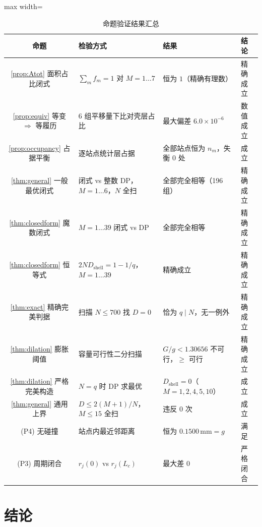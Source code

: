 \documentclass[12pt, a4paper]{ctexart}
\newcommand{\Umm}{\ensuremath{\,\mathrm{mm}}}
\begin{document}
\begin{table}[htbp]
\centering
\caption{命题验证结果汇总}
\label{tab:verify}
\begin{adjustbox}{max width=\textwidth}
\begin{tabular}{clll}
\toprule
命题 & 检验方式 & 结果 & 结论 \\
\midrule
\ref{prop:Atot} 面积占比闭式
 & $\sum_m f_m = 1$ 对 $M=1\dots7$ & 恒为 $1$（精确有理数）& 精确成立 \\
\ref{prop:equiv} 等变 $\Rightarrow$ 等履历
 & 6 组平移量下比对壳层占比 & 最大偏差 $6.0\times10^{-6}$ & 数值成立 \\
\ref{prop:occupancy} 占据平衡
 & 逐站点统计层占据 & 全部站点恒为 $n_m$，失衡 0 处 & 成立 \\
\ref{thm:general} 一般最优闭式
 & 闭式 vs 整数 DP，$M=1\dots6$，$N$ 全扫 & 全部完全相等（196 组）& 精确成立 \\
\ref{thm:closedform} 魔数闭式
 & $M=1\dots39$ 闭式 vs DP & 全部完全相等 & 精确成立 \\
\ref{thm:closedform} 恒等式
 & $2ND_{\mathrm{shell}} = 1-1/q$，$M=1\dots39$ & 精确成立 & 精确成立 \\
\ref{thm:exact} 精确完美判据
 & 扫描 $N\le700$ 找 $D=0$ & 恰为 $q\mid N$，无一例外 & 精确成立 \\
\ref{thm:dilation} 膨胀阈值
 & 容量可行性二分扫描 & $G/g<1.30656$ 不可行，$\ge$ 可行 & 精确成立 \\
\ref{thm:dilation} 严格完美构造
 & $N=q$ 时 DP 求最优 & $D_{\mathrm{shell}}=0$（$M=1,2,4,5,10$）& 成立 \\
\ref{thm:general} 通用上界
 & $D\le 2(M+1)/N$，$M\le15$ 全扫 & 违反 0 次 & 成立 \\
(P4) 无碰撞
 & 站点内最近邻距离 & 恒为 $0.1500\Umm = g$ & 满足 \\
(P3) 周期闭合
 & $r_j(0)$ vs $r_j(L_c)$ & 最大差 $0$ & 严格闭合 \\
\bottomrule
\end{tabular}
\end{adjustbox}
\end{table}

\section{结论}
\end{document}
